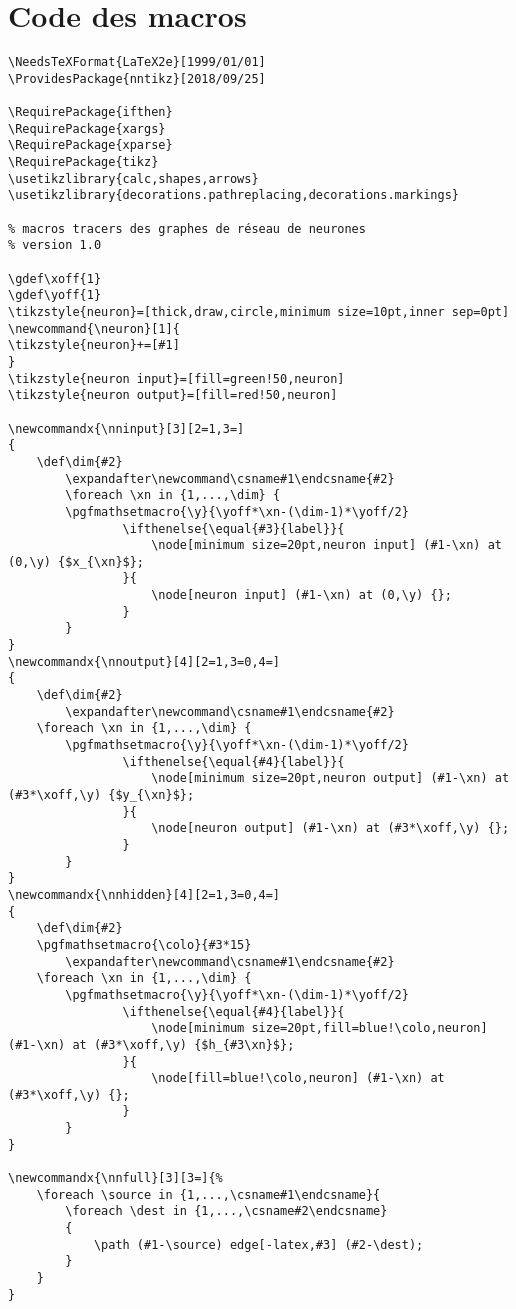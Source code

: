 \documentclass[a4paper,9pt]{article}
\begin{document}
\section{Code des macros}
\begin{verbatim}
\NeedsTeXFormat{LaTeX2e}[1999/01/01]
\ProvidesPackage{nntikz}[2018/09/25]

\RequirePackage{ifthen}
\RequirePackage{xargs}
\RequirePackage{xparse}
\RequirePackage{tikz}
\usetikzlibrary{calc,shapes,arrows}
\usetikzlibrary{decorations.pathreplacing,decorations.markings}

% macros tracers des graphes de réseau de neurones
% version 1.0

\gdef\xoff{1}
\gdef\yoff{1}
\tikzstyle{neuron}=[thick,draw,circle,minimum size=10pt,inner sep=0pt]
\newcommand{\neuron}[1]{
\tikzstyle{neuron}+=[#1]
}
\tikzstyle{neuron input}=[fill=green!50,neuron]
\tikzstyle{neuron output}=[fill=red!50,neuron]

\newcommandx{\nninput}[3][2=1,3=]
{
	\def\dim{#2}
        \expandafter\newcommand\csname#1\endcsname{#2}
        \foreach \xn in {1,...,\dim} {
		\pgfmathsetmacro{\y}{\yoff*\xn-(\dim-1)*\yoff/2}
                \ifthenelse{\equal{#3}{label}}{
                    \node[minimum size=20pt,neuron input] (#1-\xn) at (0,\y) {$x_{\xn}$};
                }{
                    \node[neuron input] (#1-\xn) at (0,\y) {};
                }
	    }
}
\newcommandx{\nnoutput}[4][2=1,3=0,4=]
{
	\def\dim{#2}
        \expandafter\newcommand\csname#1\endcsname{#2}
	\foreach \xn in {1,...,\dim} {
		\pgfmathsetmacro{\y}{\yoff*\xn-(\dim-1)*\yoff/2}
                \ifthenelse{\equal{#4}{label}}{
                    \node[minimum size=20pt,neuron output] (#1-\xn) at (#3*\xoff,\y) {$y_{\xn}$};
                }{
                    \node[neuron output] (#1-\xn) at (#3*\xoff,\y) {};
                }
	    }
}
\newcommandx{\nnhidden}[4][2=1,3=0,4=]
{
	\def\dim{#2}
	\pgfmathsetmacro{\colo}{#3*15}
        \expandafter\newcommand\csname#1\endcsname{#2}
	\foreach \xn in {1,...,\dim} {
		\pgfmathsetmacro{\y}{\yoff*\xn-(\dim-1)*\yoff/2}
                \ifthenelse{\equal{#4}{label}}{
                    \node[minimum size=20pt,fill=blue!\colo,neuron] (#1-\xn) at (#3*\xoff,\y) {$h_{#3\xn}$};
                }{
                    \node[fill=blue!\colo,neuron] (#1-\xn) at (#3*\xoff,\y) {};
                }
	    }
}

\newcommandx{\nnfull}[3][3=]{%
	\foreach \source in {1,...,\csname#1\endcsname}{
		\foreach \dest in {1,...,\csname#2\endcsname}
		{
			\path (#1-\source) edge[-latex,#3] (#2-\dest);
		}
	}
}
\end{verbatim}
\end{document}
